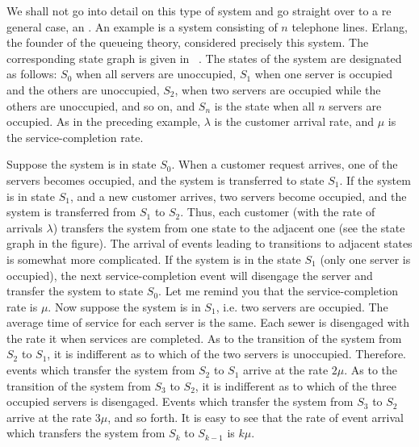 We shall not go into detail on this type of system and go straight over
to a re general case, an . An example is
a system consisting of $n$ telephone lines. Erlang, the founder of the
queueing theory, considered precisely this system. The corresponding
state graph is given in ~. The states of the system are designated as follows: $S_{0}$ when all servers are unoccupied, $S_{1}$ when one server is occupied and the others are unoccupied, $S_{2}$, when two servers are occupied while the others are unoccupied, and so on, and $S_{n}$ is the state
when all $n$ servers are occupied. As in the preceding example, $\lambda$ is the customer arrival rate, and $\mu$ is the service-completion rate.

Suppose the system is in state $S_{0}$. When a customer request arrives,
one of the servers becomes occupied, and the system is transferred to
state $S_{1}$. If the system is in state $S_{1}$, and a new customer arrives, two
servers become occupied, and the system is transferred from $S_{1}$ to $S_{2}$.
Thus, each customer (with the rate of arrivals $\lambda$) transfers the system
from one state to the adjacent one  (see the state graph
in the figure). The arrival of events leading to transitions to adjacent
states  is somewhat more complicated. If the system is
in the state $S_{1}$ (only one server is occupied), the next service-completion
event will disengage the server and transfer the system to state $S_{0}$. Let
me remind you that the service-completion rate is $\mu$. Now suppose the
system is in $S_{1}$, i.e. two servers are occupied. The average time of service
for each server is the same. Each sewer is disengaged with the rate
it when services are completed. As to the transition of the system from
$S_{2}$ to $S_{1}$, it is indifferent as to which of the two servers is unoccupied.
Therefore. events which transfer the system from $S_{2}$ to $S_{1}$ arrive at the
rate $2\mu$. As to the transition of the system from $S_{3}$ to $S_{2}$, it is indifferent as to which of the three occupied servers is disengaged. Events which
transfer the system from $S_{3}$ to $S_{2}$ arrive at the rate $3\mu$, and so forth. It is easy to see that the rate of event arrival which transfers the system from $S_{k}$ to $S_{k-1}$ is $k \mu$.

